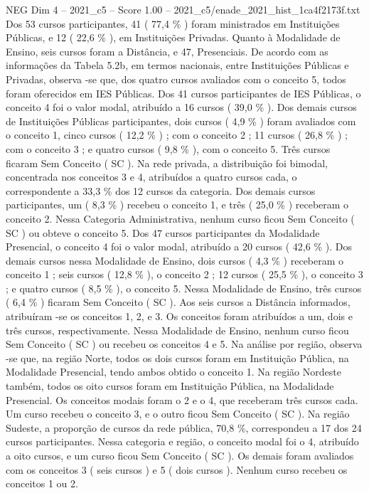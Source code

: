 \begin{textsample}{NEG Dim 4 – 2021\_c5 – Score 1.00 – 2021\_c5/enade\_2021\_hist\_1ca4f2173f.txt}
Dos 53 cursos participantes, 41 ( 77,4 \% ) foram ministrados em Instituições Públicas, e 12 ( 22,6 \% ), em Instituições Privadas.
Quanto à Modalidade de Ensino, seis cursos foram a Distância, e 47, Presenciais.
De acordo com as informações da Tabela 5.2b, em termos nacionais, entre Instituições Públicas e Privadas, observa -se que, dos quatro cursos avaliados com o conceito 5, todos foram oferecidos em IES Públicas.
Dos 41 cursos participantes de IES Públicas, o conceito 4 foi o valor modal, atribuído a 16 cursos ( 39,0 \% ).
Dos demais cursos de Instituições Públicas participantes, dois cursos ( 4,9 \% ) foram avaliados com o conceito 1, cinco cursos ( 12,2 \% ) ; com o conceito 2 ; 11 cursos ( 26,8 \% ) ; com o conceito 3 ; e quatro cursos ( 9,8 \% ), com o conceito 5.
Três cursos ficaram Sem Conceito ( SC ).
Na rede privada, a distribuição foi bimodal, concentrada nos conceitos 3 e 4, atribuídos a quatro cursos cada, o correspondente a 33,3 \% dos 12 cursos da categoria.
Dos demais cursos participantes, um ( 8,3 \% ) recebeu o conceito 1, e três ( 25,0 \% ) receberam o conceito 2.
Nessa Categoria Administrativa, nenhum curso ficou Sem Conceito ( SC ) ou obteve o conceito 5.
Dos 47 cursos participantes da Modalidade Presencial, o conceito 4 foi o valor modal, atribuído a 20 cursos ( 42,6 \% ).
Dos demais cursos nessa Modalidade de Ensino, dois cursos ( 4,3 \% ) receberam o conceito 1 ; seis cursos ( 12,8 \% ), o conceito 2 ; 12 cursos ( 25,5 \% ), o conceito 3 ; e quatro cursos ( 8,5 \% ), o conceito 5.
Nessa Modalidade de Ensino, três cursos ( 6,4 \% ) ficaram Sem Conceito ( SC ).
Aos seis cursos a Distância informados, atribuíram -se os conceitos 1, 2, e 3.
Os conceitos foram atribuídos a um, dois e três cursos, respectivamente.
Nessa Modalidade de Ensino, nenhum curso ficou Sem Conceito ( SC ) ou recebeu os conceitos 4 e 5.
Na análise por região, observa -se que, na região Norte, todos os dois cursos foram em Instituição Pública, na Modalidade Presencial, tendo ambos obtido o conceito 1.
Na região Nordeste também, todos os oito cursos foram em Instituição Pública, na Modalidade Presencial.
Os conceitos modais foram o 2 e o 4, que receberam três cursos cada.
Um curso recebeu o conceito 3, e o outro ficou Sem Conceito ( SC ).
Na região Sudeste, a proporção de cursos da rede pública, 70,8 \%, correspondeu a 17 dos 24 cursos participantes.
Nessa categoria e região, o conceito modal foi o 4, atribuído a oito cursos, e um curso ficou Sem Conceito ( SC ).
Os demais foram avaliados com os conceitos 3 ( seis cursos ) e 5 ( dois cursos ).
Nenhum curso recebeu os conceitos 1 ou 2.

\end{textsample}
